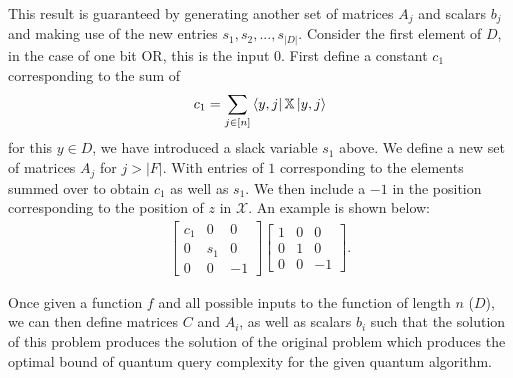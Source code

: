 This result is guaranteed by generating another set of matrices 
$A_j$ and scalars $b_j$ and making use of the new entries 
$s_1, s_2,..., s_{|D|}$. 
Consider the first element of $D$, in the case of one bit OR, 
this is the input $0$. First define a constant 
$c_1$ corresponding to the sum of
\begin{align}
    c_1 = \sum_{j \in [n]} \bra{y,j}\operatorname{\mathbb{X}}\ket{y,j}
\end{align} 
for this $y \in D$, we have introduced a slack variable $s_1$ above. 
We define a new set of matrices $A_j$ for $j > |F|$. 
With entries of $1$ corresponding to the elements summed over to obtain 
$c_1$ as well as $s_1$. We then include a $-1$ in the position
corresponding to the position of $z$ in $\mathcal{X}$. 
An example is shown below:
\begin{align}
\left[\begin{matrix} c_1 & 0 & 0 \\
                    0 & s_1 & 0 \\
                    0 & 0 & -1 \end{matrix} \right]
\left[\begin{matrix} 1 & 0 & 0 \\
                    0 & 1 & 0 \\
                    0 & 0 & -1 \end{matrix} \right].
\end{align}

Once given a function $f$ and all possible inputs to the
function of length $n$ ($D$), we can then define matrices $C$ and
$A_i$, as well as scalars $b_i$ such that the solution of this problem
produces the solution of the original problem which produces the
optimal bound of quantum query complexity for the given quantum
algorithm.
